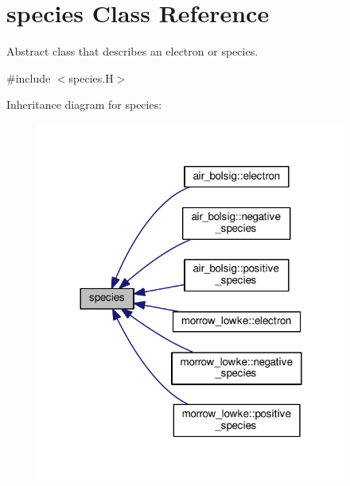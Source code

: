 \hypertarget{classspecies}{}\section{species Class Reference}
\label{classspecies}


Abstract class that describes an electron or species.  




{\ttfamily \#include $<$species.\+H$>$}



Inheritance diagram for species\+:\nopagebreak
\begin{figure}[H]
\begin{center}
\leavevmode
\includegraphics[width=288pt]{classspecies__inherit__graph}
\end{center}
\end{figure}
